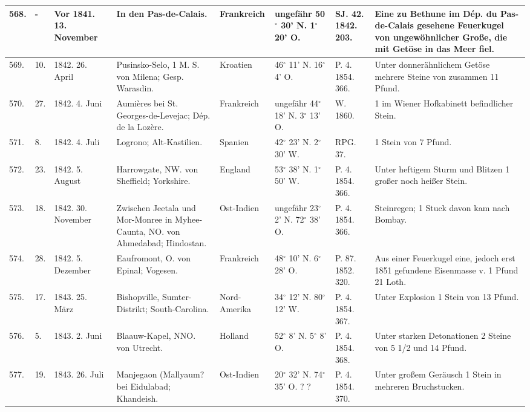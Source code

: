 \documentclass[a4paper, 11pt, oneside, polutonikogreek, german]{article}
\begin{document}
\begin{table}[!ht]
\begin{tabular}{|l|l|l|l|l|l|l|l|}
        568. & - & Vor 1841. 13. November & In den Pas-de-Calais. & Frankreich & ungefähr 50$^\circ$ 30' N. 1$^\circ$ 20' O. & SJ. 42. 1842. 203. & Eine zu Bethune im Dép. du Pas-de-Calais gesehene Feuerkugel von ungewöhnlicher Große, die mit Getöse in das Meer fiel. \\ \hline
        569. & 10. & 1842. 26. April & Pusinsko-Selo, 1 M. S. von Milena; Gesp. Warasdin. & Kroatien & 46$^\circ$ 11' N. 16$^\circ$ 4' O. & P. 4. 1854. 366. & Unter donnerähnlichem Getöse mehrere Steine von zusammen 11 Pfund. \\ \hline
        570. & 27. & 1842. 4. Juni & Aumières bei St. Georges-de-Levejac; Dép. de la Lozère. & Frankreich & ungefähr 44$^\circ$ 18' N. 3$^\circ$ 13' O. & W. 1860. & 1 im Wiener Hofkabinett befindlicher Stein. \\ \hline
        571. & 8. & 1842. 4. Juli & Logrono; Alt-Kastilien. & Spanien & 42$^\circ$ 23' N. 2$^\circ$ 30' W. & RPG. 37. & 1 Stein von 7 Pfund. \\ \hline
        572. & 23. & 1842. 5. August & Harrowgate, NW. von Sheffield; Yorkshire. & England & 53$^\circ$ 38' N. 1$^\circ$ 50' W. & P. 4. 1854. 366. & Unter heftigem Sturm und Blitzen 1 großer noch heißer Stein. \\ \hline
        573. & 18. & 1842. 30. November & Zwischen Jeetala und Mor-Monree in Myhee-Caunta, NO. von Ahmedabad; Hindostan. & Ost-Indien & ungefähr 23$^\circ$ 2' N. 72$^\circ$ 38' O. & P. 4. 1854. 366. & Steinregen; 1 Stuck davon kam nach Bombay. \\ \hline
        574. & 28. & 1842. 5. Dezember & Eaufromont, O. von Epinal; Vogesen. & Frankreich & 48$^\circ$ 10' N. 6$^\circ$ 28' O. & P. 87. 1852. 320. & Aus einer Feuerkugel eine, jedoch erst 1851 gefundene Eisenmasse v. 1 Pfund 21 Loth. \\ \hline
        575. & 17. & 1843. 25. März & Bishopville, Sumter-Distrikt; South-Carolina. & Nord-Amerika & 34$^\circ$ 12' N. 80$^\circ$ 12' W. & P. 4. 1854. 367. & Unter Explosion 1 Stein von 13 Pfund. \\ \hline
        576. & 5. & 1843. 2. Juni & Blaauw-Kapel, NNO. von Utrecht. & Holland & 52$^\circ$ 8' N. 5$^\circ$ 8' O. & P. 4. 1854. 368. & Unter starken Detonationen 2 Steine von 5 1/2 und 14 Pfund. \\ \hline
        577. & 19. & 1843. 26. Juli & Manjegaon (Mallyaum? bei Eidulabad; Khandeish. & Ost-Indien & 20$^\circ$ 32' N. 74$^\circ$ 35' O. ? ? & P. 4. 1854. 370. & Unter großem Geräusch 1 Stein in mehreren Bruchstucken. \\ \hline

\end{tabular}
\end{table}
\end{document}
